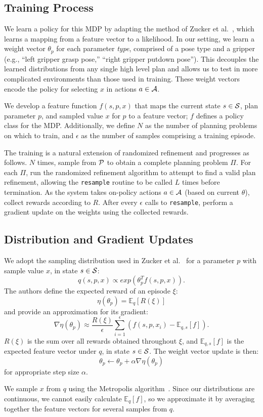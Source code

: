 \subsection{Training Process}
We learn a policy for this MDP by adapting the method of Zucker et al.~\cite{workspacebias}, which
learns a mapping from a feature vector to a likelihood. In our setting, we learn a weight
vector $\theta_{p}$ for each parameter \emph{type}, comprised of a pose type and a gripper
(e.g., ``left gripper grasp pose,'' ``right gripper putdown pose''). This decouples the learned
distributions from any single high level plan and allows us to test in more complicated environments
than those used in training. These weight vectors encode the policy for selecting $x$ in actions $a \in \mathcal{A}$.

We develop a feature function $f(s, p, x)$ that maps the current
state $s \in \mathcal{S}$, plan parameter $p$, and sampled value $x$ for $p$ to a
feature vector; $f$ defines a policy class for the MDP. Additionally, we define
$N$ as the number of planning problems on which to train, and
$\epsilon$ as the number of samples comprising a training episode.

The training is a natural extension of randomized
refinement and progresses as follows. $N$ times, sample from $\mathcal{P}$ to obtain
a complete planning problem $\Pi$. For each $\Pi$, run the randomized refinement
algorithm to attempt to find a valid plan refinement, allowing the \texttt{resample}
routine to be called $L$ times before termination. As the system takes on-policy actions $a \in \mathcal{A}$ (based on
current $\theta$), collect rewards according to $R$. After every $\epsilon$ calls to
\texttt{resample}, perform a gradient update on the weights using the
collected rewards.

\subsection{Distribution and Gradient Updates}
We adopt the sampling distribution used in Zucker et al.~\cite{workspacebias}
for a parameter $p$ with sample value $x$, in state $s \in \mathcal{S}$:
$$q(s, p, x) \propto exp(\theta_{p}^{T} f(s, p, x)).$$
The authors define the expected reward of an episode $\xi$:
$$\eta(\theta_{p}) = \mathbb{E}_{q}[R(\xi)]$$ and provide an approximation for its gradient:
$$\nabla \eta(\theta_{p}) \approx \frac{R(\xi)}{\epsilon} \sum_{i=1}^{\epsilon}(f(s, p, x_{i}) - \mathbb{E}_{q,s}[f]).$$
$R(\xi)$ is the sum over all rewards obtained throughout $\xi$, and
$\mathbb{E}_{q,s}[f]$ is the expected feature vector under $q$, in state $s \in \mathcal{S}$. The weight vector update is then:
$$\theta_{p} \leftarrow \theta_{p} + \alpha \nabla \eta(\theta_{p})$$
for appropriate step size $\alpha$.

We sample $x$ from $q$ using the Metropolis algorithm~\cite{chib1995understanding}.
Since our distributions are continuous, we cannot easily calculate $\mathbb{E}_{q}[f]$,
so we approximate it by averaging together the feature vectors for several samples from $q$.